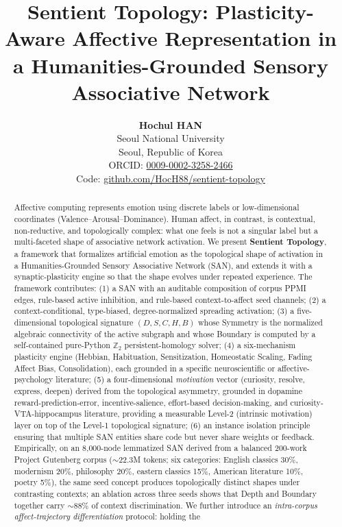 \documentclass{article}
\title{\textbf{Sentient Topology: Plasticity-Aware Affective Representation
in a Humanities-Grounded Sensory Associative Network}}
\author{
  \textbf{Hochul HAN} \\
  Seoul National University \\
  Seoul, Republic of Korea \\
  ORCID: \href{https://orcid.org/0009-0002-3258-2466}{0009-0002-3258-2466} \\
  Code: \href{https://github.com/HocH88/sentient-topology}{github.com/HocH88/sentient-topology}
}
\date{}
\begin{document}
\maketitle

\begin{abstract}
Affective computing represents emotion using discrete labels or low-dimensional
coordinates (Valence--Arousal--Dominance). Human affect, in contrast, is
contextual, non-reductive, and topologically complex: what one feels is not a
singular label but a multi-faceted shape of associative network activation.
We present \textbf{Sentient Topology}, a framework that formalizes artificial
emotion as the topological shape of activation in a Humanities-Grounded
Sensory Associative Network (SAN), and extends it with a synaptic-plasticity
engine so that the shape evolves under repeated experience. The framework
contributes: (1) a SAN with an auditable composition of corpus PPMI edges,
rule-based active inhibition, and rule-based context-to-affect seed channels;
(2) a context-conditional, type-biased, degree-normalized spreading
activation; (3) a five-dimensional topological signature
$(D, S, C, H, B)$ whose Symmetry is the normalized algebraic connectivity of
the active subgraph and whose Boundary is computed by a self-contained
pure-Python $\mathbb{Z}_2$ persistent-homology solver; (4) a six-mechanism
plasticity engine (Hebbian, Habituation, Sensitization, Homeostatic Scaling,
Fading Affect Bias, Consolidation), each grounded in a specific
neuroscientific or affective-psychology literature; (5) a four-dimensional
\emph{motivation} vector (curiosity, resolve, express, deepen) derived from
the topological asymmetry, grounded in dopamine reward-prediction-error,
incentive-salience, effort-based decision-making, and curiosity-VTA-hippocampus
literature, providing a measurable Level-2 (intrinsic motivation) layer on
top of the Level-1 topological signature; (6) an instance isolation
principle ensuring that multiple SAN entities share code but never share
weights or feedback. Empirically, on an 8{,}000-node lemmatized SAN derived
from a balanced 200-work Project Gutenberg corpus ($\sim$22.3M tokens; six
categories: English classics 30\%, modernism 20\%, philosophy 20\%, eastern
classics 15\%, American literature 10\%, poetry 5\%), the same seed concept
produces topologically distinct shapes under contrasting contexts; an
ablation across three seeds shows that Depth and Boundary together carry
$\sim$88\% of context discrimination. We further introduce an
\emph{intra-corpus affect-trajectory differentiation} protocol: holding the

\end{abstract}
\end{document}

